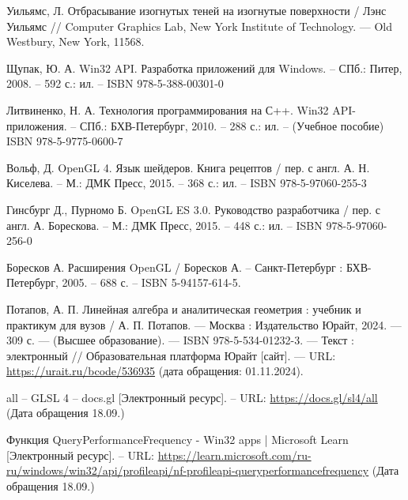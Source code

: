 \renewcommand\bibname{СПИСОК ИСПОЛЬЗОВАННЫХ ИСТОЧНИКОВ}

\begin{thebibliography}{}

    Уильямс, Л. Отбрасывание изогнутых теней на изогнутые поверхности /
    Лэнс Уильямс // Computer Graphics Lab, New York Institute of Technology.
    — Old Westbury, New York, 11568.

    Щупак, Ю. А.
    Win32 API. Разработка приложений для Windows.
    -- СПб.: Питер, 2008. -- 592 с.: ил. -- ISBN 978-5-388-00301-0

    Литвиненко, Н. А.
    Технология программирования на С++. Win32 API-приложения.
    -- СПб.: БХВ-Петербург, 2010. -- 288 с.: ил. -- (Учебное пособие) ISBN 978-5-9775-0600-7

    Вольф, Д.
    OpenGL 4. Язык шейдеров. Книга рецептов / пер. с англ. А. Н. Киселева.
    -- М.: ДМК Пресс, 2015. – 368 с.: ил. -- ISBN 978-5-97060-255-3

    Гинсбург Д., Пурномо Б.
    OpenGL ES 3.0. Руководство разработчика / пер. с англ. А. Борескова.
    -- М.: ДМК Пресс, 2015. – 448 с.: ил. -- ISBN 978-5-97060-256-0

    Боресков А.
    Расширения OpenGL / Боресков А. -- Санкт-Петербург :
    БХВ-Петербург, 2005. -- 688 с.
    -- ISBN 5-94157-614-5.

    Потапов, А. П.  Линейная алгебра и аналитическая геометрия :
    учебник и практикум для вузов / А. П. Потапов. — Москва :
    Издательство Юрайт, 2024. — 309 с. — (Высшее образование).
    — ISBN 978-5-534-01232-3. — Текст :
    электронный // Образовательная платформа Юрайт [сайт].
    — URL: \url{https://urait.ru/bcode/536935} (дата обращения: 01.11.2024).

    all -- GLSL 4 -- docs.gl [Электронный ресурс].
    -- URL: \url{https://docs.gl/sl4/all}
    (Дата обращения 18.09.\the\year)

    Функция QueryPerformanceFrequency - Win32 apps | Microsoft Learn [Электронный ресурс].
    -- URL: \url{https://learn.microsoft.com/ru-ru/windows/win32/api/profileapi/nf-profileapi-queryperformancefrequency}
    (Дата обращения 18.09.\the\year)

\end{thebibliography}